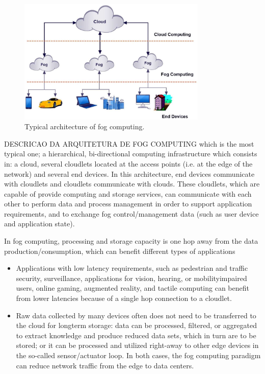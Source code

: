 
\begin{figure}
	\centering
	\includegraphics[width=90mm]{images/fog_architecture}
	\caption{Typical architecture of fog computing.}
	\label{fog_architecture}
\end{figure}

DESCRICAO DA ARQUITETURA DE FOG COMPUTING
which is the most typical one; a hierarchical, bi-directional computing infrastructure which consists in: a cloud, several cloudlets located at the access points (i.e. at the edge of the network) and several end devices. In this architecture, end devices communicate with cloudlets and cloudlets communicate with clouds. These cloudlets, which are capable of provide computing and storage services, can communicate with each other to perform data and process management in order to support application requirements, and to exchange fog control/management data (such as user device and application state).

In fog computing, processing and storage capacity is one hop away from the data production/consumption, which can benefit different types of applications

\begin{itemize}
	\item Applications with low latency requirements, such as pedestrian and traffic security, surveillance, applications for vision, hearing, or mobilityimpaired users, online gaming, augmented reality, and tactile computing can benefit from lower latencies because of a single hop connection to a cloudlet.
	\item Raw data collected by many devices often does not need to be transferred to the cloud for longterm storage: data can be processed, filtered, or aggregated to extract knowledge and produce reduced data sets, which in turn are to be stored; or it can be processed and utilized right-away to other edge devices in the so-called sensor/actuator loop. In both cases, the fog computing paradigm can reduce network traffic from the edge to data centers.
\end{itemize}

